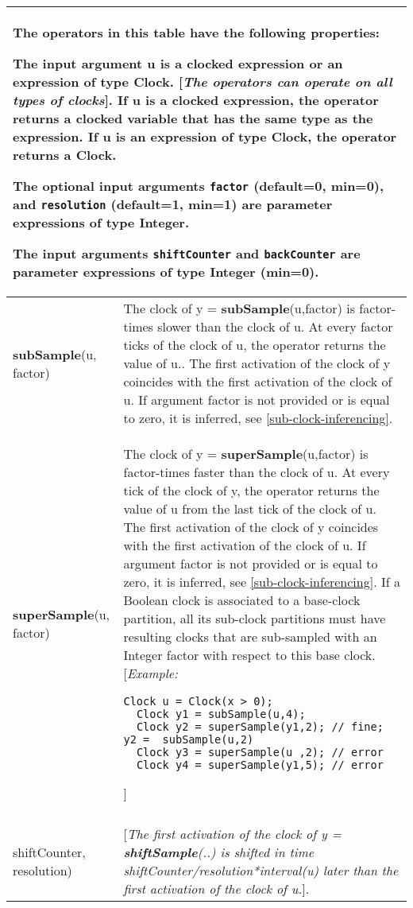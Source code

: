 \begin{longtable}[]{|p{4cm}|p{11cm}|}
\hline \endhead
\multicolumn{2}{|p{15cm}|}{
The operators in this table have the following properties:

The input argument u is a clocked expression or an expression of type
Clock. {[}\emph{The operators can operate on all types of clocks}{]}. If
u is a clocked expression, the operator returns a clocked variable that
has the same type as the expression. If u is an expression of type
Clock, the operator returns a Clock.

The optional input arguments \lstinline[basicstyle=\ttfamily]!factor! (default=0, min=0), and \lstinline[basicstyle=\ttfamily]!resolution!
(default=1, min=1) are parameter expressions of type Integer.

The input arguments \lstinline[basicstyle=\ttfamily]!shiftCounter! and \lstinline[basicstyle=\ttfamily]!backCounter! are parameter
expressions of type Integer (min=0).}
\\ \hline
\textbf{subSample}(u, factor)
&
The clock of y = \textbf{subSample}(u,factor) is factor-times slower
than the clock of u. At every factor ticks of the clock of u, the
operator returns the value of u.. The first activation of the clock of y
coincides with the first activation of the clock of u. If argument
factor is not provided or is equal to zero, it is inferred, see 
\autoref{sub-clock-inferencing}.
\\ \hline
\textbf{superSample}(u, factor)
&
The clock of y = \textbf{superSample}(u,factor) is factor-times faster
than the clock of u. At every tick of the clock of y, the operator
returns the value of u from the last tick of the clock of u. The first
activation of the clock of y coincides with the first activation of the
clock of u. If argument factor is not provided or is equal to zero, it
is inferred, see \autoref{sub-clock-inferencing}. If a Boolean clock is associated to a
base-clock partition, all its sub-clock partitions must have resulting
clocks that are sub-sampled with an Integer factor with respect to this
base clock.
{[}\emph{Example:}
\begin{lstlisting}[language=modelica]
  Clock u = Clock(x > 0);
  Clock y1 = subSample(u,4);
  Clock y2 = superSample(y1,2); // fine; y2 =  subSample(u,2)
  Clock y3 = superSample(u ,2); // error
  Clock y4 = superSample(y1,5); // error
\end{lstlisting}
  {]}\\ \hline
\begin{tabular}{@{}p{4cm}@{}}
\textbf{shiftSample}(u,\\
shiftCounter, resolution)
\end{tabular}
& {[}\emph{The first activation of the clock of y =
\textbf{shiftSample}(..) is shifted in time
shiftCounter/resolution*interval(u) later than the first activation of
the clock of u.}{]}.


\end{longtable}

